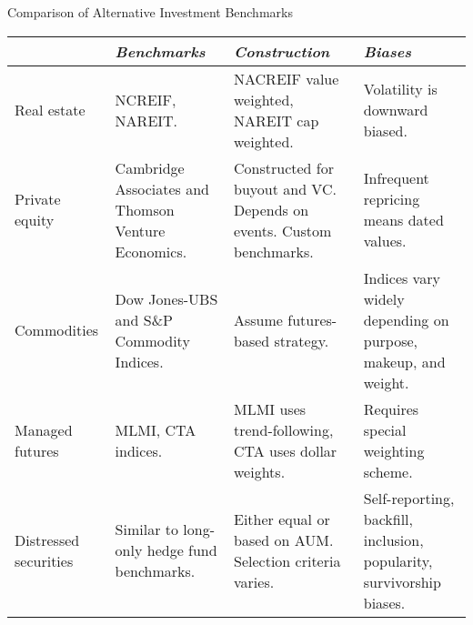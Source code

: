 \documentclass[../custom,grid]{flashcards}
\begin{document}
\begin{flashcard}{Comparison of Alternative Investment Benchmarks}
    \begin{tabular}{
        >{\raggedright}p{.8in}
        >{\raggedright}p{1in}
        >{\raggedright}p{1.2in}
        >{\raggedright\arraybackslash}p{1.2in}}
        \toprule
        & \textit{Benchmarks} & \textit{Construction} & \textit{Biases}\\ \midrule
        Real estate &
        NCREIF, NAREIT. &
        NACREIF value weighted, NAREIT cap weighted. &
        Volatility is downward biased.\\ \midrule
        Private equity &
        Cambridge Associates and Thomson Venture Economics. &
        Constructed for buyout and VC. Depends on events. Custom benchmarks. &
        Infrequent repricing means dated values.\\ \midrule
        Commodities &
        Dow Jones-UBS and S\&P Commodity Indices. &
        Assume futures-based strategy. &
        Indices vary widely depending on purpose, makeup, and weight.\\ \midrule
        Managed futures &
        MLMI, CTA indices. &
        MLMI uses trend-following, CTA uses dollar weights. &
        Requires special weighting scheme.\\ \midrule
        Distressed securities &
        Similar to long-only hedge fund benchmarks. &
        Either equal or based on AUM. Selection criteria varies. &
        Self-reporting, backfill, inclusion, popularity, survivorship biases.\\ \bottomrule
    \end{tabular}
\end{flashcard}
\end{document}

